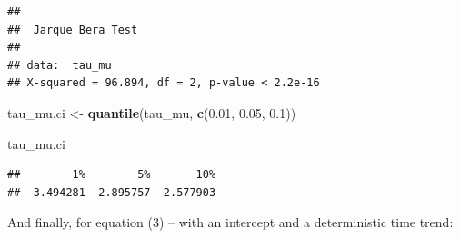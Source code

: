 \documentclass[11pt, a4paper]{report}
\newenvironment{Shaded}{\begin{snugshade}}{\end{snugshade}}
\newcommand{\CommentTok}[1]{\textcolor[rgb]{0.56,0.35,0.01}{\textit{#1}}}
\newcommand{\FloatTok}[1]{\textcolor[rgb]{0.00,0.00,0.81}{#1}}
\newcommand{\KeywordTok}[1]{\textcolor[rgb]{0.13,0.29,0.53}{\textbf{#1}}}
\newcommand{\NormalTok}[1]{#1}
\newcommand{\StringTok}[1]{\textcolor[rgb]{0.31,0.60,0.02}{#1}}
\theoremstyle{plain}
\theoremstyle{plain}
\theoremstyle{remark}
\begin{document}
\begin{Shaded}
\end{Shaded}

\begin{verbatim}
## 
##  Jarque Bera Test
## 
## data:  tau_mu
## X-squared = 96.894, df = 2, p-value < 2.2e-16
\end{verbatim}

\begin{Shaded}
\begin{Highlighting}[]
\NormalTok{tau_mu.ci <-}\StringTok{ }\KeywordTok{quantile}\NormalTok{(tau_mu, }\KeywordTok{c}\NormalTok{(}\FloatTok{0.01}\NormalTok{, }\FloatTok{0.05}\NormalTok{, }\FloatTok{0.1}\NormalTok{))}

\NormalTok{tau_mu.ci}
\end{Highlighting}
\end{Shaded}

\begin{verbatim}
##        1%        5%       10% 
## -3.494281 -2.895757 -2.577903
\end{verbatim}

And finally, for equation (3) -- with an intercept and a deterministic
time trend:
\end{document}
